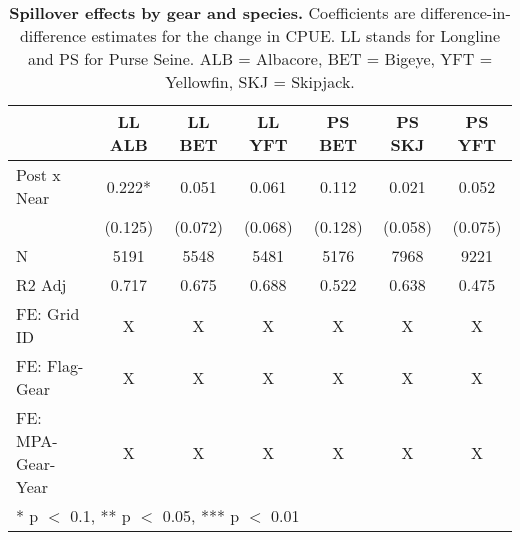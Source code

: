 \begin{table}

\caption{\label{tab:spp_reg}\textbf{Spillover effects by gear and species.} Coefficients are 
             difference-in-difference estimates for the change in CPUE. LL stands for Longline and PS for Purse Seine. ALB = Albacore, BET = Bigeye, YFT = Yellowfin, SKJ = Skipjack.}
\centering
\begin{tabular}[t]{lcccccc}
\toprule
  & LL ALB & LL BET & LL YFT & PS BET & PS SKJ & PS YFT\\
\midrule
Post x Near & \num{0.222}* & \num{0.051} & \num{0.061} & \num{0.112} & \num{0.021} & \num{0.052}\\
 & (\num{0.125}) & (\num{0.072}) & (\num{0.068}) & (\num{0.128}) & (\num{0.058}) & (\num{0.075})\\
\midrule
N & \num{5191} & \num{5548} & \num{5481} & \num{5176} & \num{7968} & \num{9221}\\
R2 Adj & \num{0.717} & \num{0.675} & \num{0.688} & \num{0.522} & \num{0.638} & \num{0.475}\\
FE: Grid ID & X & X & X & X & X & X\\
FE: Flag-Gear & X & X & X & X & X & X\\
FE: MPA-Gear-Year & X & X & X & X & X & X\\
\bottomrule
\multicolumn{7}{l}{\rule{0pt}{1em}* p $<$ 0.1, ** p $<$ 0.05, *** p $<$ 0.01}\\
\end{tabular}
\end{table}
